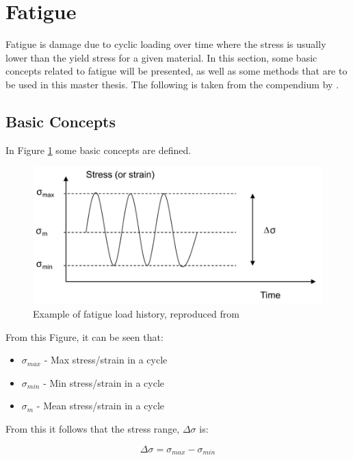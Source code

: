 \section{Fatigue}
Fatigue is damage due to cyclic loading over time where the stress is usually lower than the yield stress for a given material. In this section, some basic concepts related to fatigue will be presented, as well as some methods that are to be used in this master thesis. The following is taken from the compendium by \cite{fatigue2016}. \newline
\newline
\subsection{Basic Concepts}
In Figure \ref{fig:fatigue} some basic concepts are defined. 

\begin{figure}[h!]
\centering
\includegraphics[scale=0.6]{figures/cycle}
\caption[$\; \:$Example of fatigue load history]{Example of fatigue load history, reproduced from  \cite{fatigue2016} }
 \label{fig:fatigue}
\end{figure}

From this Figure, it can be seen that:
\begin{itemize}
    \item $\sigma_{max}$ -  Max stress/strain in a cycle
    \item $\sigma_{min}$ -  Min stress/strain in a cycle
    \item $\sigma_{m}$ - Mean stress/strain in a cycle
\end{itemize}

From this it follows that the stress range, $\Delta \sigma$ is:

\begin{equation}
    \Delta \sigma =\sigma_{max} - \sigma_{min}
\end{equation}

